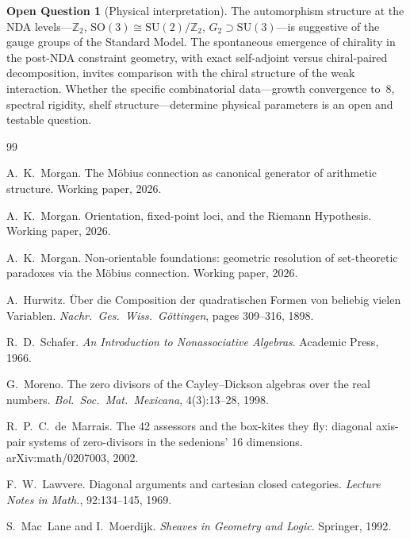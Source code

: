 \documentclass[12pt,a4paper]{article}
\theoremstyle{definition}
\newtheorem{openquestion}[theorem]{Open Question}
\theoremstyle{remark}
\newcommand{\Z}{\mathbb{Z}}
\begin{document}
\begin{openquestion}[Physical interpretation]
\label{open:physics}
The automorphism structure at the NDA levels---$\Z_2$,
$\mathrm{SO}(3) \cong \mathrm{SU}(2)/\Z_2$,
$G_2 \supset \mathrm{SU}(3)$---is suggestive of the gauge groups
of the Standard Model. The spontaneous emergence of chirality
in the post-NDA constraint geometry, with exact self-adjoint
versus chiral-paired decomposition, invites comparison with the
chiral structure of the weak interaction. Whether the specific
combinatorial data---growth convergence to~$8$, spectral rigidity,
shelf structure---determine physical parameters is an open and
testable question.
\end{openquestion}



\begin{thebibliography}{99}

A.~K.~Morgan.
\newblock The M\"{o}bius connection as canonical generator of
arithmetic structure.
\newblock Working paper, 2026.

A.~K.~Morgan.
\newblock Orientation, fixed-point loci, and the Riemann
Hypothesis.
\newblock Working paper, 2026.

A.~K.~Morgan.
\newblock Non-orientable foundations: geometric resolution of
set-theoretic paradoxes via the M\"{o}bius connection.
\newblock Working paper, 2026.

A.~Hurwitz.
\newblock \"{U}ber die Composition der quadratischen Formen von
beliebig vielen Variablen.
\newblock \emph{Nachr.\ Ges.\ Wiss.\ G\"{o}ttingen},
pages 309--316, 1898.

R.~D.~Schafer.
\newblock \emph{An Introduction to Nonassociative Algebras}.
\newblock Academic Press, 1966.

G.~Moreno.
\newblock The zero divisors of the Cayley--Dickson algebras over
the real numbers.
\newblock \emph{Bol.\ Soc.\ Mat.\ Mexicana}, 4(3):13--28, 1998.

R.~P.~C.~de~Marrais.
\newblock The 42 assessors and the box-kites they fly: diagonal
axis-pair systems of zero-divisors in the sedenions' 16
dimensions.
\newblock arXiv:math/0207003, 2002.

F.~W.~Lawvere.
\newblock Diagonal arguments and cartesian closed categories.
\newblock \emph{Lecture Notes in Math.}, 92:134--145, 1969.

S.~Mac~Lane and I.~Moerdijk.
\newblock \emph{Sheaves in Geometry and Logic}.
\newblock Springer, 1992.

\end{thebibliography}
\end{document}
